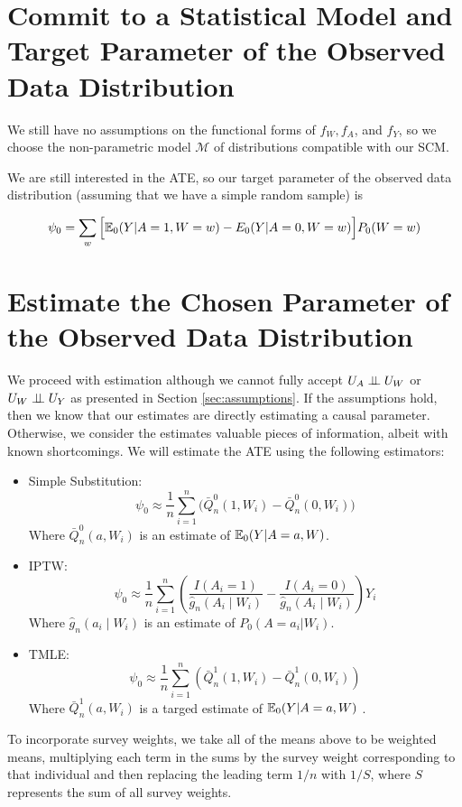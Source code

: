 \documentclass{article}
\begin{document}
\section{Commit to a Statistical Model and Target Parameter of the Observed Data Distribution}

We still have no assumptions on the functional forms of $f_W, f_A$, and $f_Y$, so we choose the non-parametric model $\mathcal{M}$ of distributions compatible with our SCM.  

We are still interested in the ATE, so our target parameter of the observed data distribution (assuming that we have a simple random sample) is

$$\psi_0 = \sum_{w}\Big[\mathbb{E}_0(Y|A=1,W=w)-E_0(Y|A=0,W=w)\Big]P_0(W=w)$$

\section{Estimate the Chosen Parameter of the Observed Data Distribution}
\label{sec:estimates}

We proceed with estimation although we cannot fully accept $U_A \perp\hspace{-5pt}\perp U_W$ or $U_W \perp\hspace{-5pt}\perp U_Y$ as presented in Section \ref{sec:assumptions}. If the assumptions hold, then we know that our estimates are directly estimating a causal parameter. Otherwise, we consider the estimates valuable pieces of information, albeit with known shortcomings. We will estimate the ATE using the following estimators: 

\begin{itemize}
  \item Simple Substitution:
    \[
      \psi_0 \approx \frac{1}{n}\sum_{i=1}^{n}\Big(\bar{Q}_{n}^{0}(1,W_i) - \bar{Q}_{n}^{0}(0,W_i)\Big)
    \]
Where $\bar{Q}_{n}^{0}(a,W_i)$ is an estimate of $\mathbb{E}_0(Y|A=a,W)$.
  \item IPTW:
  \[
    \psi_{0} \approx \frac{1}{n}\sum_{i=1}^{n} \left(\frac{I(A_i=1)}{\hat{g}_n(A_i \mid W_i)} - \frac{I(A_i=0)}{\hat{g}_n(A_i \mid W_i)} \right)Y_i
  \]
Where $\hat{g}_n(a_i \mid W_i)$ is an estimate of $P_0(A=a_i|W_i)$.
  \item TMLE:
  \[
    \psi_{0} \approx \frac{1}{n}\sum_{i=1}^{n}\left( \bar{Q}_{n}^{1}(1,W_i) - \bar{Q}_{n}^{1}(0,W_i)\right)
  \]
Where $\bar{Q}_{n}^{1}(a,W_i)$ is a targed estimate of $\mathbb{E}_0(Y|A=a,W)$ \cite{tmle}.
\end{itemize}

To incorporate survey weights, we take all of the means above to be weighted means, multiplying each term in the sums by the survey weight corresponding to that individual and then replacing the leading term $1/n$ with $1/S$, where $S$ represents the sum of all survey weights.
\end{document}
